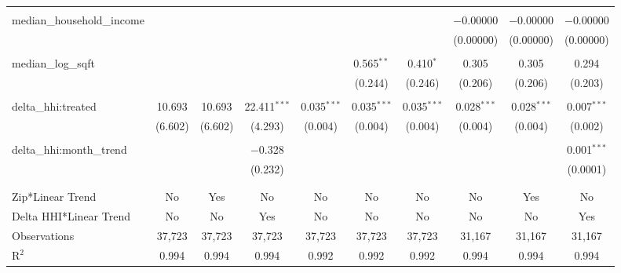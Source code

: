 \begin{table}[H]
{\begin{tabular}{@{\extracolsep{5pt}}lccccccccc}
   & & & & & & & & & \\  

  median\_household\_income &  &  &  &  &  &  & $-$0.00000 & $-$0.00000 & $-$0.00000 \\  

   &  &  &  &  &  &  & (0.00000) & (0.00000) & (0.00000) \\  

   & & & & & & & & & \\  

  median\_log\_sqft &  &  &  &  & 0.565$^{**}$ & 0.410$^{*}$ & 0.305 & 0.305 & 0.294 \\  

   &  &  &  &  & (0.244) & (0.246) & (0.206) & (0.206) & (0.203) \\  

   & & & & & & & & & \\  

  delta\_hhi:treated & 10.693 & 10.693 & 22.411$^{***}$ & 0.035$^{***}$ & 0.035$^{***}$ & 0.035$^{***}$ & 0.028$^{***}$ & 0.028$^{***}$ & 0.007$^{***}$ \\  

   & (6.602) & (6.602) & (4.293) & (0.004) & (0.004) & (0.004) & (0.004) & (0.004) & (0.002) \\  

   & & & & & & & & & \\  

  delta\_hhi:month\_trend &  &  & $-$0.328 &  &  &  &  &  & 0.001$^{***}$ \\  

   &  &  & (0.232) &  &  &  &  &  & (0.0001) \\  

   & & & & & & & & & \\  

 \hline \\[-1.8ex]  

 Zip*Linear Trend & No & Yes & No & No & No & No & No & Yes & No \\  

 Delta HHI*Linear Trend & No & No & Yes & No & No & No & No & No & Yes \\  

 Observations & 37,723 & 37,723 & 37,723 & 37,723 & 37,723 & 37,723 & 31,167 & 31,167 & 31,167 \\  

 R$^{2}$ & 0.994 & 0.994 & 0.994 & 0.992 & 0.992 & 0.992 & 0.994 & 0.994 & 0.994 \\  


\end{tabular}}
\end{table}
